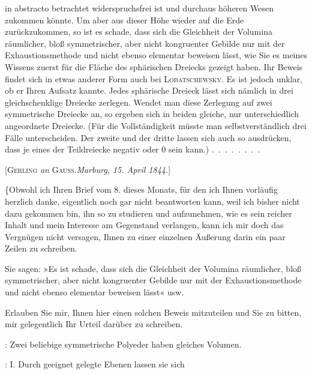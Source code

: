 %
\noindent in abstracto betrachtet widerspruchsfrei ist und durchaus höheren Wesen zukommen könnte. Um aber aus dieser Höhe wieder auf die Erde zurückzukommen, so ist es schade, dass sich die Gleichheit der Volumina räumlicher, bloß symmetrischer, aber nicht kongruenter Gebilde nur mit der Exhaustionsmethode und nicht ebenso elementar beweisen lässt, wie Sie es meines Wissens zuerst für die Fläche des sphärischen Dreiecks gezeigt haben. Ihr Beweis findet sich in etwas anderer Form auch bei \textsc{Lobatschewsky}. Es ist jedoch unklar, ob er Ihren Aufsatz kannte. Jedes sphärische Dreieck lässt sich nämlich in drei gleichschenklige Dreiecke zerlegen. Wendet man diese Zerlegung auf zwei symmetrische Dreiecke an, so ergeben sich in beiden gleiche, nur unterschiedlich angeordnete Dreiecke. (Für die Vollständigkeit müsste man selbstverständlich drei Fälle unterscheiden. Der zweite und der dritte lassen sich auch so ausdrücken, dass je eines der Teildreiecke negativ oder 0 sein kann.)
\mbox{.\ .\ .\ .\ .\ .\ .\ .}

\par\bigskip

\begin{center}
[\textsc{Gerling} \emph{an} \textsc{Gauss}.\quad \emph{Marburg, 15. April 1844.}]
\end{center}

\{Obwohl ich Ihren Brief vom 8. dieses Monats, für den ich Ihnen vorläufig herzlich danke, eigentlich noch gar nicht beantworten kann, weil ich bisher nicht dazu gekommen bin, ihn so zu studieren und aufzunehmen, wie es sein reicher Inhalt und mein Interesse am Gegenstand verlangen, kann ich mir doch das Vergnügen nicht versagen, Ihnen zu einer einzelnen Äußerung darin ein paar Zeilen zu schreiben.

Sie sagen: »Es ist schade, dass sich die Gleichheit der Volumina räumlicher, bloß symmetrischer, aber nicht kongruenter Gebilde nur mit der Exhaustionsmethode und nicht ebenso elementar beweisen lässt«
usw.

Erlauben Sie mir, Ihnen hier einen solchen Beweis mitzuteilen und Sie zu bitten, mir gelegentlich Ihr Urteil darüber zu schreiben.

: Zwei beliebige symmetrische Polyeder haben gleiches Volumen.

: I. Durch geeignet gelegte Ebenen lassen sie sich\space%
